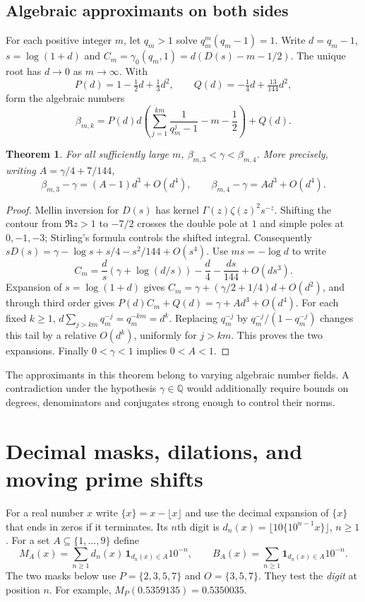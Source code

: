 \documentclass[11pt,a4paper]{article}
\newtheorem{theorem}{Theorem}[section]
\theoremstyle{definition}\newtheorem{definition}[theorem]{Definition}\newtheorem{example}[theorem]{Example}
\theoremstyle{remark}\newtheorem{remark}[theorem]{Remark}
\newcommand{\Q}{\mathbb Q}\newcommand{\Z}{\mathbb Z}\newcommand{\R}{\mathbb R}\newcommand{\N}{\mathbb N}
\begin{document}
\subsection{Algebraic approximants on both sides}
For each positive integer $m$, let $q_m>1$ solve $q_m^m(q_m-1)=1$.
Write $d=q_m-1$, $s=\log(1+d)$ and $C_m=\gamma_0(q_m,1)=d(D(s)-m-1/2)$.
The unique root has $d\to0$ as $m\to\infty$. With
\[
 P(d)=1-\tfrac12 d+\tfrac13 d^2,\qquad
 Q(d)=-\tfrac14d+\tfrac{13}{144}d^2,
\]
form the algebraic numbers
\[
 \beta_{m,k}=P(d)d\left(\sum_{j=1}^{km}\frac{1}{q_m^j-1}
                                  -m-\frac12\right)+Q(d).
\]
\begin{theorem}\label{thm:plastic-sandwich}
For all sufficiently large $m$,
$\beta_{m,3}<\gamma<\beta_{m,4}$. More precisely, writing $A=\gamma/4+7/144$,
\[
 \beta_{m,3}-\gamma=(A-1)d^3+O(d^4),\qquad
 \beta_{m,4}-\gamma=A d^3+O(d^4).
\]
\end{theorem}
\begin{proof}
Mellin inversion for $D(s)$ has kernel $\Gamma(z)\zeta(z)^2s^{-z}$. Shifting the contour from $\Re z>1$ to $-7/2$ crosses the double pole at $1$ and simple poles at $0,-1,-3$; Stirling's formula controls the shifted integral. Consequently
$sD(s)=\gamma-\log s+s/4-s^2/144+O(s^4)$.
Use $ms=-\log d$ to write
\[
 C_m=\frac{d}{s}\left(\gamma+\log(d/s)\right)-\frac d4-\frac{ds}{144}+O(ds^3).
\]
Expansion of $s=\log(1+d)$ gives $C_m=\gamma+(\gamma/2+1/4)d+O(d^2)$, and through third order gives $P(d)C_m+Q(d)=\gamma+Ad^3+O(d^4)$.
For each fixed $k\ge1$, $d\sum_{j>km}q_m^{-j}=q_m^{-km}=d^k$.
Replacing $q_m^{-j}$ by $q_m^{-j}/(1-q_m^{-j})$ changes this tail by a relative $O(d^k)$, uniformly for $j>km$. This proves the two expansions. Finally $0<\gamma<1$ implies $0<A<1$.
\end{proof}
The approximants in this theorem belong to varying algebraic number fields. A contradiction under the hypothesis $\gamma\in\Q$ would additionally require bounds on degrees, denominators and conjugates strong enough to control their norms.
\section{Decimal masks, dilations, and moving prime shifts}\label{sec:decimal-orbits}
For a real number $x$ write $\{x\}=x-\lfloor x\rfloor$ and use the decimal
expansion of $\{x\}$ that ends in zeros if it terminates. Its $n$th digit is
$d_n(x)=\lfloor10\{10^{n-1}x\}\rfloor$, $n\ge1$. For a set
$A\subseteq\{1,\ldots,9\}$ define
\[
 M_A(x)=\sum_{n\ge1}d_n(x)\,\mathbf1_{d_n(x)\in A}10^{-n},\qquad
 B_A(x)=\sum_{n\ge1}\mathbf1_{d_n(x)\in A}10^{-n}.
\]
The two masks below use $P=\{2,3,5,7\}$ and $O=\{3,5,7\}$. They test the
\emph{digit} at position $n$. For example, $M_P(0.5359135)=0.5350035$.
\end{document}
